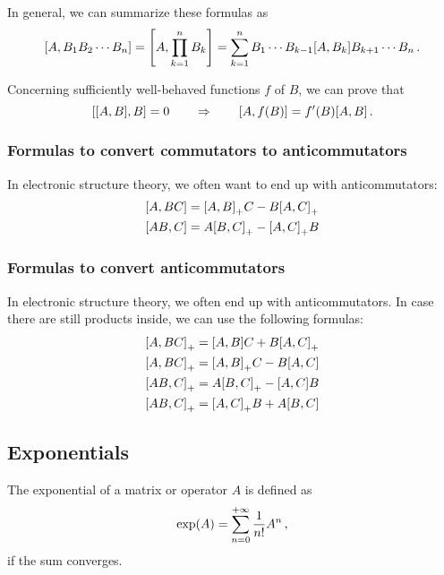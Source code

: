         In general, we can summarize these formulas as
        \begin{equation}
            \comm{A}{B_1 B_2 \cdots B_n} = \comm{A}{\prod_{k=1}^n B_k} = \sum_{k=1}^n B_1 \cdots B_{k-1} \comm{A}{B_k} B_{k+1} \cdots B_n \thinspace .
        \end{equation}

        Concerning sufficiently well-behaved functions $f$ of $B$, we can prove that
        \begin{equation}
            \comm{\comm{A}{B}}{B} = 0 \qquad\Rightarrow\qquad \comm{A}{f(B)} = f'(B) \comm{A}{B} \thinspace .
        \end{equation}

    \subsubsection{Formulas to convert commutators to anticommutators}
        In electronic structure theory, we often want to end up with anticommutators:
        \begin{align}
            & \comm{A}{BC} = \comm{A}{B}_+ C - B \comm{A}{C}_+ \\
            & \comm{AB}{C} = A \comm{B}{C}_+ - \comm{A}{C}_+ B
        \end{align}

    \subsubsection{Formulas to convert anticommutators}
        In electronic structure theory, we often end up with anticommutators. In case there are still products inside, we can use the following formulas:
        \begin{align}
            & \comm{A}{BC}_+ = \comm{A}{B} C + B \comm{A}{C}_+ \\
            & \comm{A}{BC}_+ = \comm{A}{B}_+ C - B \comm{A}{C} \\
            & \comm{AB}{C}_+ = A \comm{B}{C}_+ - \comm{A}{C} B \\
            & \comm{AB}{C}_+ = \comm{A}{C}_+ B + A \comm{B}{C}
        \end{align}

    \subsection{Exponentials}
        The exponential of a matrix or operator $A$ is defined as
        \begin{equation}
            \exp(A) = \sum_{n=0}^{+\infty} \frac{1}{n!} A^n \thinspace ,
        \end{equation}
        if the sum converges. \\

